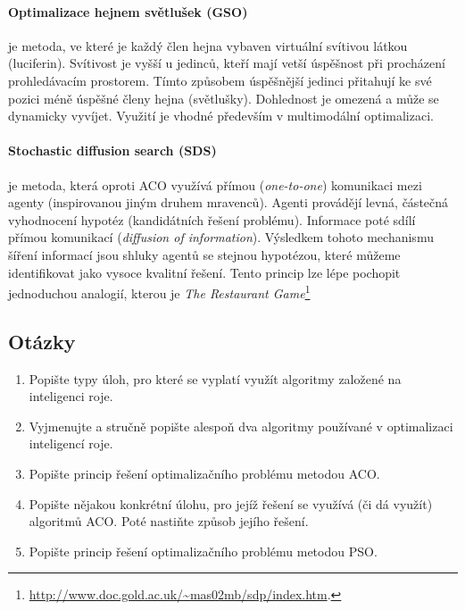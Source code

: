 \documentclass[a4paper,12pt]{article}
\begin{document}
\paragraph{Optimalizace hejnem světlušek (GSO)}je metoda, ve které je každý člen hejna vybaven virtuální
 svítivou látkou (luciferin). Svítivost je vyšší u jedinců, kteří mají vetší úspěšnost při procházení
 prohledávacím prostorem. Tímto způsobem úspěšnější jedinci přitahují ke své pozici méně úspěšné členy
 hejna (světlušky). Dohlednost je omezená a může se dynamicky vyvíjet. Využití je vhodné především
 v multimodální optimalizaci.

\paragraph{Stochastic diffusion search (SDS)}je metoda, která oproti ACO využívá přímou ({\it one-to-one})
 komunikaci mezi agenty (inspirovanou jiným druhem mravenců). Agenti provádějí levná, částečná vyhodnocení
 hypotéz (kandidátních řešení problému). Informace poté sdílí přímou komunikací (\textit{diffusion of
 information}). Výsledkem tohoto mechanismu šíření informací jsou shluky agentů se stejnou hypotézou, které
 můžeme identifikovat jako vysoce kvalitní řešení. Tento princip lze lépe pochopit jednoduchou analogií,
 kterou je \textit{The Restaurant Game}\footnote{\url{http://www.doc.gold.ac.uk/~mas02mb/sdp/index.htm}.}


\subsection{Otázky}
\begin{enumerate}
  \item Popište typy úloh, pro které se vyplatí využít algoritmy založené na inteligenci roje.
  \item Vyjmenujte a stručně popište alespoň dva algoritmy používané v optimalizaci inteligencí roje.
  \item Popište princip řešení optimalizačního problému metodou ACO.
  \item Popište nějakou konkrétní úlohu, pro jejíž řešení se využívá (či dá využít)
        algoritmů ACO. Poté nastiňte způsob jejího řešení.
  \item Popište princip řešení optimalizačního problému metodou PSO.
\end{enumerate}

\newpage

\end{document}
